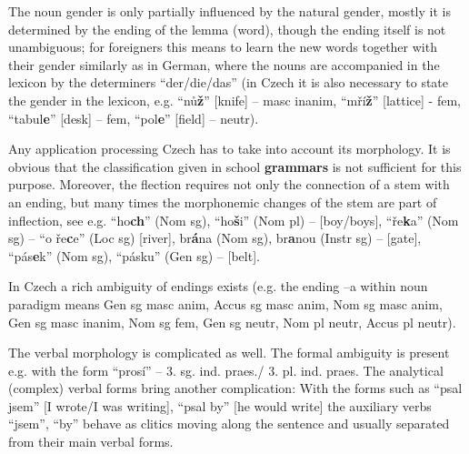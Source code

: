 \begin{multicols}{2}
The noun gender is only partially influenced by the natural gender, mostly it is determined by the ending of the lemma (word), though the ending itself  is not unambiguous; for foreigners this means to learn the new words together with their gender similarly as in German, where the nouns are accompanied in the lexicon by the determiners “der/die/das”  (in Czech it is also necessary to state the gender in the lexicon, e.g. “nů\textbf{ž}” {[}knife{]} – masc inanim, “mří\textbf{ž}”  {[}lattice{]} -  fem, “tabul\textbf{e}” {[}desk{]} – fem, “pol\textbf{e}” {[}field{]} – neutr).

Any application processing Czech has to take into account its morphology. It is obvious that the classification given in school \textbf{grammars} is not sufficient for this purpose. Moreover, the flection requires not only the connection of a stem with an ending, but many times the morphonemic changes of the stem are part of inflection, see e.g. “ho\textbf{ch}” (Nom sg), “ho\textbf{š}i” (Nom pl) – {[}boy/boys{]}, “ře\textbf{k}a” (Nom sg) – “o ře\textbf{c}e” (Loc sg) {[}river{]}, br\textbf{á}na (Nom sg), br\textbf{a}nou (Instr sg) – {[}gate{]}, “pás\textbf{e}k” (Nom sg), “pásku” (Gen sg) – {[}belt{]}.

In Czech a rich ambiguity of endings exists (e.g. the ending –a within noun paradigm means Gen sg masc anim, Accus sg masc anim, Nom sg masc anim, Gen sg masc inanim, Nom sg fem, Gen sg neutr, Nom pl neutr, Accus pl neutr).

The verbal morphology is complicated as well. The formal ambiguity is present e.g. with the form “prosí” – 3. sg. ind. praes./ 3. pl. ind. praes. The analytical (complex) verbal forms bring another complication: With the forms such as “psal jsem” {[}I wrote/I was writing{]}, “psal by” {[}he would write{]} the auxiliary verbs “jsem”, “by”  behave as clitics moving along the sentence and usually separated from their main verbal forms.


\end{multicols}
